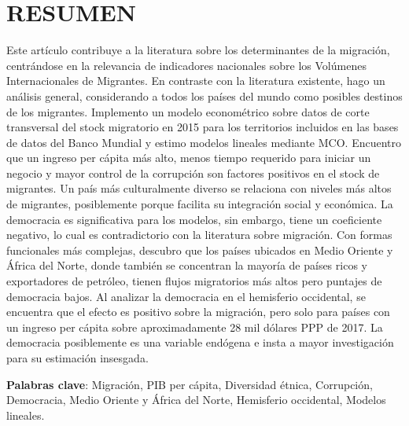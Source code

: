\documentclass[../main.tex]{subfiles}
\begin{document}
\justifying
\section*{RESUMEN}
\begin{nohyphens}
\noindent
Este artículo contribuye a la literatura sobre los determinantes de la migración, centrándose en la relevancia de indicadores nacionales sobre los Volúmenes Internacionales de Migrantes. En contraste con la literatura existente, hago un análisis general, considerando a todos los países del mundo como posibles destinos de los migrantes. Implemento un modelo econométrico sobre datos de corte transversal del stock migratorio en 2015 para los territorios incluidos en las bases de datos del Banco Mundial y estimo modelos lineales mediante MCO. Encuentro que un ingreso per cápita más alto, menos tiempo requerido para iniciar un negocio y mayor control de la corrupción son factores positivos en el stock de migrantes. Un país más culturalmente diverso se relaciona con niveles más altos de migrantes, posiblemente porque facilita su integración social y económica. La democracia es significativa para los modelos, sin embargo, tiene un coeficiente negativo, lo cual es contradictorio con la literatura sobre migración. Con formas funcionales más complejas, descubro que los países ubicados en Medio Oriente y África del Norte, donde también se concentran la mayoría de países ricos y exportadores de petróleo, tienen flujos migratorios más altos pero puntajes de democracia bajos. Al analizar la democracia en el hemisferio occidental, se encuentra que el efecto es positivo sobre la migración, pero solo para países con un ingreso per cápita sobre aproximadamente 28 mil dólares PPP de 2017. La democracia posiblemente es una variable endógena e insta a mayor investigación para su estimación insesgada.
\end{nohyphens}
\noindent \textbf{Palabras clave}: Migración, PIB per cápita, Diversidad étnica, Corrupción, Democracia, Medio Oriente y África del Norte, Hemisferio occidental, Modelos lineales.
\clearpage
\end{document}
